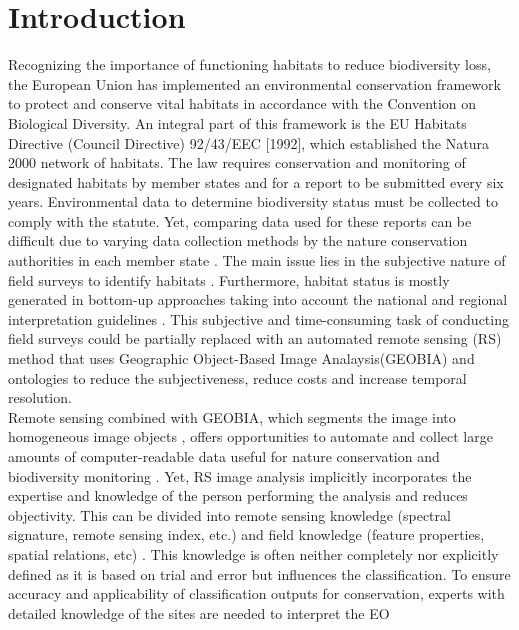 \documentclass[authoryear, review,12pt,number]{elsarticle}
\begin{document}
\section{Introduction}
Recognizing the importance of functioning habitats to reduce biodiversity loss, 
the European Union has implemented an environmental conservation framework to 
protect and conserve vital habitats in accordance with the Convention on 
Biological Diversity. An integral part of this framework is the EU 
Habitats Directive (Council Directive) 92/43/EEC [1992], which established the 
Natura 2000 network of habitats. The law requires conservation and monitoring 
of designated habitats by member states and for a report to be submitted every 
six years. Environmental data to determine biodiversity status must be 
collected to comply with the statute. Yet, comparing data used for these reports 
can be difficult due to varying data collection methods by the nature 
conservation authorities in each member state \citep{INSPIREdataspecs, INSPIRE}. 
The main issue lies in the subjective nature of field surveys to identify 
habitats \citep{Cherrill1999, Cherrill1999a, Nieland2015}. Furthermore, habitat 
status is mostly generated in bottom-up approaches taking into account the 
national and regional interpretation guidelines \citep{INSPIREdataspecs}. This 
subjective and time-consuming task of conducting field surveys could be 
partially replaced with an automated remote sensing (RS) method that uses  
Geographic Object-Based Image Analaysis(GEOBIA) and ontologies to reduce the 
subjectiveness, reduce costs and increase temporal resolution.
\\
Remote sensing combined with GEOBIA, which segments the image into homogeneous 
image objects \citep{Blaschke2010}, offers opportunities to automate and 
collect large amounts of computer-readable data useful for nature conservation 
and biodiversity monitoring \citep{Corbane2015, VandenBorre2011, Mayer2011}. 
Yet, RS image analysis implicitly incorporates the expertise and knowledge of 
the person performing the analysis and reduces objectivity. This can be divided 
into remote sensing knowledge (spectral signature, remote sensing index, etc.) 
and field knowledge (feature properties, spatial relations, etc) 
\citep{Andres2013a}. This knowledge is often neither completely nor explicitly 
defined as it is based on trial and error but influences the classification. To 
ensure accuracy and applicability of classification outputs for conservation, 
experts with detailed knowledge of the sites are needed to interpret the EO 
\end{document}
